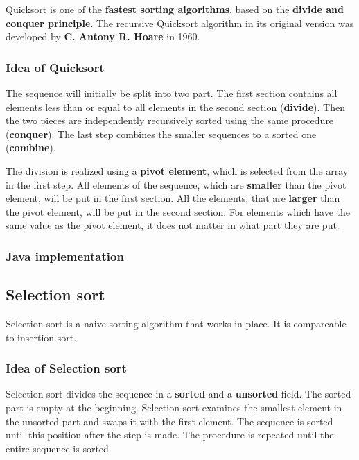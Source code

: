 \documentclass[11pt, a4paper, titlepage, twoside]{article}
\renewcommand{\emph}{\textbf}
\begin{document}
	Quicksort is one of the \emph{fastest sorting algorithms}, based on the \emph{divide and conquer principle}. The recursive Quicksort algorithm in its original version was developed by \emph{C. Antony R. Hoare} in 1960.
	
	\subsubsection{Idea of Quicksort}
	
	The sequence will initially be split into two part. The first section contains all elements less than or equal to all elements in the second section (\emph{divide}). Then the two pieces are independently recursively sorted using the same procedure (\emph{conquer}). The last step combines the smaller sequences to a sorted one (\emph{combine}).
	
	The division is realized using a \emph{pivot element}, which is selected from the array in the first step. All elements of the sequence, which are \emph{smaller} than the pivot element, will be put in the first section. All the elements, that are \emph{larger} than the pivot element, will be put in the second section. For elements which have the same value as the pivot element, it does not matter in what part they are put.
	
	\subsubsection{Java implementation}
	
	
	
	\subsection{Selection sort}
	
	Selection sort is a naive sorting algorithm that works in place. It is compareable to insertion sort.
	
	\subsubsection{Idea of Selection sort}
	
	Selection sort divides the sequence in a \emph{sorted} and a \emph{unsorted} field. The sorted part is empty at the beginning. Selection sort examines the smallest element in the unsorted part and swaps it with the first element. The sequence is sorted until this position after the step is made. The procedure is repeated until the entire sequence is sorted.
	
\end{document}
